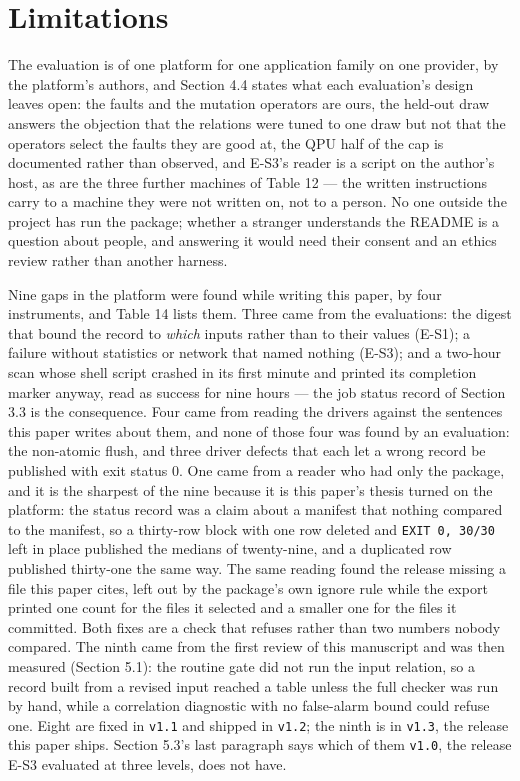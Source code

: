 \documentclass[acmsmall,screen,review]{acmart}
\begin{document}
\section{Limitations}

The evaluation is of one platform for one application family on one provider, by the platform's authors, and Section 4.4 states what each evaluation's design leaves open: the faults and the mutation operators are ours, the held-out draw answers the objection that the relations were tuned to one draw but not that the operators select the faults they are good at, the QPU half of the cap is documented rather than observed, and E-S3's reader is a script on the author's host, as are the three further machines of Table 12 --- the written instructions carry to a machine they were not written on, not to a person. No one outside the project has run the package; whether a stranger understands the README is a question about people, and answering it would need their consent and an ethics review rather than another harness.


Nine gaps in the platform were found while writing this paper, by four instruments, and Table 14 lists them. Three came from the evaluations: the digest that bound the record to \textit{which} inputs rather than to their values (E-S1); a failure without statistics or network that named nothing (E-S3); and a two-hour scan whose shell script crashed in its first minute and printed its completion marker anyway, read as success for nine hours --- the job status record of Section 3.3 is the consequence. Four came from reading the drivers against the sentences this paper writes about them, and none of those four was found by an evaluation: the non-atomic flush, and three driver defects that each let a wrong record be published with exit status 0. One came from a reader who had only the package, and it is the sharpest of the nine because it is this paper's thesis turned on the platform: the status record was a claim about a manifest that nothing compared to the manifest, so a thirty-row block with one row deleted and \texttt{EXIT 0, 30/30} left in place published the medians of twenty-nine, and a duplicated row published thirty-one the same way. The same reading found the release missing a file this paper cites, left out by the package's own ignore rule while the export printed one count for the files it selected and a smaller one for the files it committed. Both fixes are a check that refuses rather than two numbers nobody compared. The ninth came from the first review of this manuscript and was then measured (Section 5.1): the routine gate did not run the input relation, so a record built from a revised input reached a table unless the full checker was run by hand, while a correlation diagnostic with no false-alarm bound could refuse one. Eight are fixed in \texttt{v1.1} and shipped in \texttt{v1.2}; the ninth is in \texttt{v1.3}, the release this paper ships. Section 5.3's last paragraph says which of them \texttt{v1.0}, the release E-S3 evaluated at three levels, does not have.
\end{document}
